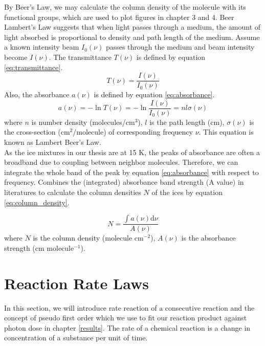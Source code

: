 By Beer’s Law, we may calculate the column density of the molecule with its functional groups, which are used to plot figures in chapter 3 and 4. Beer Lambert’s Law suggests that when light passes through a medium, the amount of light absorbed is proportional to density and path length of the medium. Assume a known intensity beam $I_{0}(\nu)$ passes through the medium and beam intensity become $I(\nu)$. The transmittance $T(\nu)$ is defined by equation \ref{eq:transmittance}. \\
\begin{equation}
T(\nu) = \frac{I(\nu)}{I_{0}(\nu)}
\label{eq:transmittance}
\end{equation}
Also, the absorbance $a(\nu)$ is defined by equation \ref{eq:absorbance}. \\
\begin{equation}
a(\nu) = - \ln T(\nu) = - \ln \frac{I(\nu)}{I_{0}(\nu)} = n l \sigma(\nu)
\label{eq:absorbance}
\end{equation}
where $n$ is number density (molecules/cm$^3$), $l$ is the path length (cm), $\sigma(\nu)$ is the cross-section (cm$^2$/molecule) of corresponding frequency $\nu$. This equation is known as Lambert Beer’s Law. \\

As the ice mixtures in our thesis are at 15 K, the peaks of absorbance are often a broadband due to coupling between neighbor molecules. Therefore, we can integrate the whole band of the peak by equation \ref{eq:absorbance} with respect to frequency. Combines the (integrated) absorbance band strength (A value) in literatures to calculate the column densities $N$ of the ices by equation \ref{eq:column_density}.

\begin{equation}
N = \frac{\int a(\nu) \mathrm{d}\nu}{A(\nu)}
\label{eq:column_density}
\end{equation}
where $N$ is the column density (molecule cm$^{-2}$), $A(\nu)$ is the absorbance strength (cm molecule$^{-1}$).

\section{Reaction Rate Laws}
\label{sec:Reaction_Rate_Laws}
In this section, we will introduce rate reaction of a consecutive reaction and the concept of pseudo first order which we use to fit our reaction product against photon dose in chapter \ref{results}. The rate of a chemical reaction is a change in concentration of a substance per unit of time.

